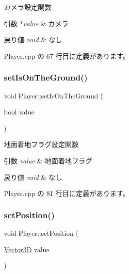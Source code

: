 カメラ設定関数 


\begin{DoxyParams}{引数}
{\em $\ast$value} & カメラ \\
\hline
\end{DoxyParams}

\begin{DoxyRetVals}{戻り値}
{\em void} & なし \\
\hline
\end{DoxyRetVals}


 Player.\+cpp の 67 行目に定義があります。

\mbox{\label{class_player_ae6433f8257774cb0eb102b7ad0431161}} 
\subsubsection{\texorpdfstring{set\+Is\+On\+The\+Ground()}{setIsOnTheGround()}}
{\footnotesize\ttfamily void Player\+::set\+Is\+On\+The\+Ground (\begin{DoxyParamCaption}\item[{bool}]{value }\end{DoxyParamCaption})}



地面着地フラグ設定関数 


\begin{DoxyParams}{引数}
{\em value} & 地面着地フラグ \\
\hline
\end{DoxyParams}

\begin{DoxyRetVals}{戻り値}
{\em void} & なし \\
\hline
\end{DoxyRetVals}


 Player.\+cpp の 81 行目に定義があります。

\mbox{\label{class_player_a4d067dc5b3d71b842b09b2149cb26276}} 
\subsubsection{\texorpdfstring{set\+Position()}{setPosition()}}
{\footnotesize\ttfamily void Player\+::set\+Position (\begin{DoxyParamCaption}\item[{\mbox{\hyperlink{class_vector3_d}{Vector3D}}}]{value }\end{DoxyParamCaption})}



